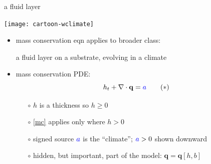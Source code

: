 \documentclass[xcolor={dvipsnames}]{beamer}
\newcommand\bq{\mathbf{q}}
\newcommand\Div{\nabla\cdot}
\begin{document}
\begin{frame}{a fluid layer}

\begin{center}
\texttt{[image: cartoon-wclimate]}
\end{center}

\vspace{-7mm}
\begin{itemize}
\item mass conservation eqn applies to broader class:
  \begin{center}
  \alert{a fluid layer on a substrate, evolving in a climate}
  \end{center}
\item mass conservation PDE:
\begin{equation}
h_t + \Div\bq = {\color{blue} a}  \tag{$\ast$} \label{mc}
\end{equation}
    \begin{itemize}
    \vspace{-4mm}
    \item[$\circ$] $h$ is a thickness so $h\ge 0$
    \item[$\circ$] \eqref{mc} applies only where $h>0$
    \item[$\circ$] signed source ${\color{blue} a}$ is the ``climate''; ${\color{blue} a}>0$ shown downward
    \item[$\circ$] hidden, but important, part of the model: $\bq=\bq[h,b]$
    \end{itemize}
\end{itemize}
\end{frame}
\end{document}
